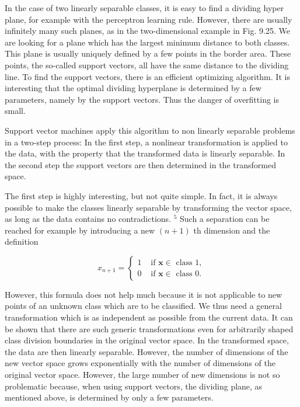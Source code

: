 \documentclass[10pt]{book}
\begin{document}
In the case of two linearly separable classes, it is easy to find a dividing hyper plane, for example with the perceptron learning rule. However, there are usually infinitely many such planes, as in the two-dimensional example in Fig. 9.25. We are looking for a plane which has the largest minimum distance to both classes. This plane is usually uniquely defined by a few points in the border area. These points, the so-called support vectors, all have the same distance to the dividing line. To find the support vectors, there is an efficient optimizing algorithm. It is interesting that the optimal dividing hyperplane is determined by a few parameters, namely by the support vectors. Thus the danger of overfitting is small.

Support vector machines apply this algorithm to non linearly separable problems in a two-step process: In the first step, a nonlinear transformation is applied to the data, with the property that the transformed data is linearly separable. In the second step the support vectors are then determined in the transformed space.

The first step is highly interesting, but not quite simple. In fact, it is always possible to make the classes linearly separable by transforming the vector space, as long as the data contains no contradictions. ${ }^{5}$ Such a separation can be reached for example by introducing a new $(n+1)$ th dimension and the definition

$$
x_{n+1}= \begin{cases}1 & \text { if } \boldsymbol{x} \in \text { class } 1, \\ 0 & \text { if } \boldsymbol{x} \in \text { class } 0 .\end{cases}
$$

However, this formula does not help much because it is not applicable to new points of an unknown class which are to be classified. We thus need a general transformation which is as independent as possible from the current data. It can be shown that there are such generic transformations even for arbitrarily shaped class division boundaries in the original vector space. In the transformed space, the data are then linearly separable. However, the number of dimensions of the new vector space grows exponentially with the number of dimensions of the original vector space. However, the large number of new dimensions is not so problematic because, when using support vectors, the dividing plane, as mentioned above, is determined by only a few parameters.
\end{document}

